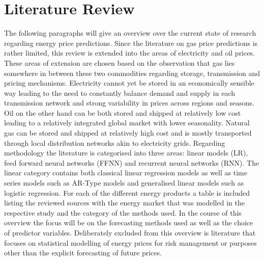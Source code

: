 \chapter{Literature Review} \label{sec:Literature}
The following paragraphs will give an overview over the current state of research regarding energy price predictions. Since the literature on gas price predictions is rather limited, this review is extended into the areas of electricity and oil prices. 
These areas of extension are chosen based on the observation that gas lies somewhere in between these two commodities regarding storage, transmission and pricing mechanisms. Electricity cannot yet be stored in an economically sensible way leading to the need to constantly balance demand and supply in each transmission network and strong variability in prices across regions and seasons. Oil on the other hand can be both stored and shipped at relatively low cost leading to a relatively integrated global market with lower seasonality. Natural gas can be stored and shipped at relatively high cost and is mostly transported through local distribution networks akin to electricity grids. Regarding methodology the literature is categorised into three areas: linear models (LR), feed forward neural networks (FFNN) and recurrent neural networks (RNN). The linear category contains both classical linear regression models as well as time series models such as AR-Type models and generalised linear models such as logistic regression. For each of the different energy products a table is included listing the reviewed sources with the energy market that was modelled in the respective study and the category of the methods used. In the course of this overview the focus will be on the forecasting methods used as well as the choice of predictor variables. Deliberately excluded from this overview is literature that focuses on statistical modelling of energy prices for risk management or purposes other than the explicit forecasting of future prices.

